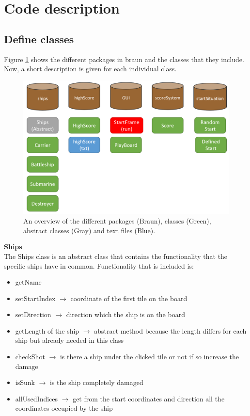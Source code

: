 \documentclass[a4paper,10pt]{article}
\begin{document}
\section{Code description}

\subsection{Define classes}
Figure \ref{f:differentClasses} shows the different packages in braun and the classes that they include. Now, a short description is given for each individual class.

\begin{figure}[h!]
	\begin{center}
		\includegraphics[width=1.0\linewidth]{overviewClasses.PNG}
	\end{center}	
	\caption{An overview of the different packages (Braun), classes (Green), abstract classes (Gray) and text files (Blue).}
	\label{f:differentClasses}
\end{figure}

\newpage

\textbf{Ships}\\
The Ships class is an abstract class that contains the functionality that the specific ships have in common. Functionality that is included is: 
\begin{itemize}
	\item getName 
	\item setStartIndex $ \rightarrow $ coordinate of the first tile on the board
	\item setDirection $ \rightarrow $ direction which the ship is on the board
	\item getLength of the ship $ \rightarrow $ abstract method because the length differs for each ship but already needed in this class
	\item checkShot $ \rightarrow $ is there a ship under the clicked tile or not if so increase the damage
	\item isSunk $ \rightarrow $ is the ship completely damaged
	\item allUsedIndices $ \rightarrow $ get from the start coordinates and direction all the coordinates occupied by the ship
\end{itemize}
\end{document}
